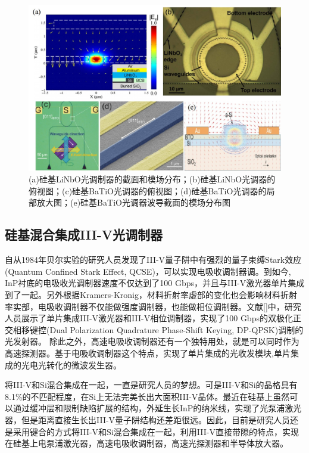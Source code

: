 \begin{figure}[htb]
	\centering
	\includegraphics[width=12cm]{./Pictures/fig_othter_mod.jpg}
	\caption{ (a)硅基LiNbO光调制器的截面和模场分布\cite{chen2014hybrid}；(b)硅基LiNbO光调器的俯视图\cite{palmer2014high}；(c)硅基BaTiO光调器的俯视图\cite{xiong2014active}；(d)硅基BaTiO光调器的局部放大图\cite{xiong2014active}；(e)硅基BaTiO光调器波导截面的模场分布图\cite{xiong2014active}}
	\label{fig_othter_mod.jpg}
\end{figure}
\subsection{硅基混合集成III-V光调制器}
自从1984年贝尔实验的研究人员发现了III-V量子阱中有强烈的量子束缚Stark效应(Quantum Confined Stark Effect, QCSE)，可以实现电吸收调制器调\cite{miller1984band, wood1984high}。到如今, InP衬底的电吸收光调制器速度不仅达到了100 Gbps，并且与III-V激光器单片集成到了一起\cite{chacinski2009monolithically, kazmierski2009100}。另外根据Kramers-Kronig，材料折射率虚部的变化也会影响材料折射率实部，电吸收调制器不仅能做强度调制器，也能做相位调制器。文献[]中，研究人员展示了单片集成III-V激光器和III-V相位调制器，实现了100 Gbps的双极化正交相移键控(Dual Polarization Quadrature Phase-Shift Keying, DP-QPSK)调制的光发射器\cite{poirier2015inp}。 除此之外，高速电吸收调制器还有一个独特用处，就是可以同时作为高速探测器\cite{miller1985electric}。基于电吸收调制器这个特点，实现了单片集成的光收发模块\cite{welstand1996dual,chen2016wavelength},单片集成的光电光转化的微波发生器\cite{zhou2014compact}。

将III-V和Si混合集成在一起，一直是研究人员的梦想。可是III-V和Si的晶格具有8.1\%的不匹配程度，在Si上无法完美长出大面积III-V晶体。最近在硅基上虽然可以通过缓冲层和限制缺陷扩展的结构，外延生长InP的纳米线，实现了光泵浦激光器\cite{wang2015room}，但是距离直接生长出III-V量子阱结构还差距很远。因此，目前是研究人员还是采用键合的方式将III-V和Si混合集成在一起，利用III-V直接带隙的特点，实现在硅基上电泵浦激光器，高速电吸收调制器，高速光探测器和半导体放大器\cite{liang2010hybrid,roelkens2010iii,liang2010recent,duan2014hybrid}。

